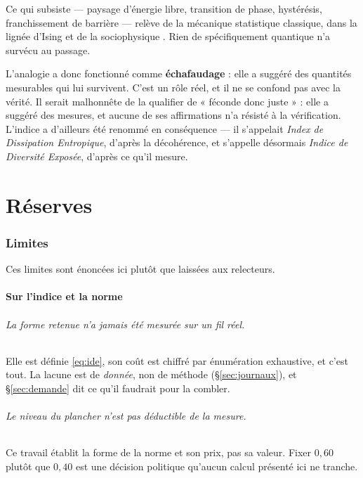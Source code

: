 \documentclass[11pt,a4paper]{article}
\begin{document}
Ce qui subsiste --- paysage d'énergie libre, transition de phase, hystérésis, franchissement
de barrière --- relève de la mécanique statistique classique, dans la lignée d'Ising et de la
sociophysique \citep{galam2004,castellano2009}. Rien de spécifiquement quantique n'a survécu
au passage.

L'analogie a donc fonctionné comme \textbf{échafaudage} : elle a suggéré des quantités
mesurables qui lui survivent. C'est un rôle réel, et il ne se confond pas avec la vérité. Il
serait malhonnête de la qualifier de « féconde donc juste » : elle a suggéré des mesures, et
aucune de ses affirmations n'a résisté à la vérification. L'indice a d'ailleurs été renommé en
conséquence --- il s'appelait \emph{Index de Dissipation Entropique}, d'après la décohérence,
et s'appelle désormais \emph{Indice de Diversité Exposée}, d'après ce qu'il mesure.

\part{Réserves}

\section{Limites}
\label{sec:limites}

Ces limites sont énoncées ici plutôt que laissées aux relecteurs.

\subsection{Sur l'indice et la norme}

\paragraph{La forme retenue n'a jamais été mesurée sur un fil réel.} Elle est définie
\eqref{eq:ide}, son coût est chiffré par énumération exhaustive, et c'est tout. La lacune est
de \emph{donnée}, non de méthode (\S\ref{sec:journaux}), et \S\ref{sec:demande} dit ce qu'il
faudrait pour la combler.

\paragraph{Le niveau du plancher n'est pas déductible de la mesure.} Ce travail établit la
forme de la norme et son prix, pas sa valeur. Fixer $0{,}60$ plutôt que $0{,}40$ est une
décision politique qu'aucun calcul présenté ici ne tranche.
\end{document}
